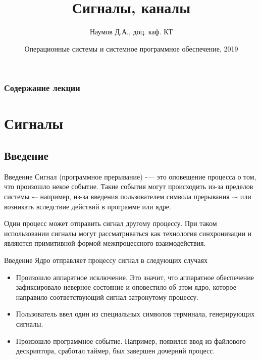 \documentclass{beamer}
\title[Язык C]{Сигналы, каналы}
\author{Наумов Д.А., доц. каф. КТ}
\date[15.10.2019] {Операционные системы и системное программное обеспечение, 2019}
\begin{document}
\begin{frame}
  \titlepage
\end{frame}
  
\begin{frame}
  \frametitle{Содержание лекции}
  \tableofcontents  
\end{frame}

\section{Сигналы}
\subsection{Введение}

\begin{frame}{Введение}
    Сигнал (программное прерывание) -— это оповещение процесса о том, что произошло некое событие. Такие события могут происходить из-за пределов системы -– например, из-за введения пользователем символа прерывания –- или возникать вследствие действий в программе или ядре.
    
    Один процесс может отправить сигнал другому процессу. При таком использовании сигналы могут рассматриваться как технология синхронизации и являются примитивной формой межпроцессного взаимодействия.
\end{frame}

\begin{frame}{Введение}
    Ядро отправляет процессу сигнал в следующих случаях
    \begin{itemize}
        \item Произошло аппаратное исключение. Это значит, что аппаратное обеспечение зафиксировало неверное состояние и оповестило об этом ядро, которое направило соответствующий сигнал затронутому процессу.
        \item Пользователь ввел один из специальных символов терминала, генерирующих сигналы.
        \item Произошло программное событие. Например, появился ввод из файлового дескриптора, сработал таймер, был завершен дочерний процесс.
    \end{itemize}
\end{frame}
\end{document}
